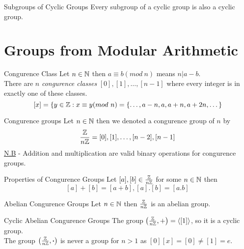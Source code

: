 \documentclass[11pt,a4paper]{article}
\begin{document}
\subtitle{Theorem 7.06 - }{Subgroups of Cyclic Groups}
Every subgroup of a cyclic group is also a cyclic group.\\

\section{Groups from Modular Arithmetic}

\subtitle{Definition 8.01 - }{Congurence Class}
Let $n \in \mathbb{N}$ then $a \equiv b (mod\ n)$ means $n | a - b$.\\
There are $n$ \textit{congurence classes} $[0], [1], \dots , [n-1]$ where every integer is in exactly one of these classes.
$$[x] = \{y \in \mathbb{Z} : x \equiv y (mod\ n) = \{ \dots , a-n , a , a+n , a+2n , \dots\}$$

\subtitle{Definition 8.02 - }{Congurence groups}
Let $n \in \mathbb{N}$ then we denoted a congurence group of $n$ by
$$\frac{\mathbb{Z}}{n\mathbb{Z}} = {[0], [1] , \dots , [n-2] , [n-1]}$$
\underline{N.B} - Addition and multiplication are valid binary operations for congurence groups.\\

\subtitle{Definition 8.03 - }{Properties of Congurence Groups}
Let $[a], [b] \in \frac{\mathbb{Z}}{n\mathbb{Z}}$ for some $n \in \mathbb{N}$ then
$$[a] + [b] = [a + b], [a].[b] = [a.b]$$

\subtitle{Theorem 8.04 - }{Abelian Congurence Groups}
Let $n \in \mathbb{N}$ then $\frac{\mathbb{Z}}{n\mathbb{Z}}$ is an abelian group.\\

\subtitle{Theorem 8.05 - }{Cyclic Abelian Congurence Groups}
The group $\left( \frac{\mathbb{Z}}{n\mathbb{Z}}, + \right) = \langle [1] \rangle$, so it is a cyclic group.\\
The group $\left( \frac{\mathbb{Z}}{n\mathbb{Z}}, \boldsymbol{\cdot} \right)$ is never a group for $n > 1$ as $[0][x] = [0] \not = [1] = e$.
\end{document}
